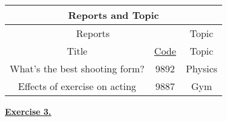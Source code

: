 \documentclass[12pt]{article}
\begin{document}
\begin{center}
    \begin{tabular}{|c|c||c|}
        \hline
        \multicolumn{3}{|c|}{\cellcolor{gray!25}Reports and Topic}                     \\
        \hline
        \hline
        \multicolumn{2}{|c||}{\cellcolor{gray!25}Reports}
                                       & {\cellcolor{gray!25}Topic}                    \\
        \hline
        \cellcolor{gray!25}Title
                                       & \cellcolor{gray!25}\underline{Code}
                                       & \cellcolor{gray!25}Topic                      \\
        \hline \hline
        What's the best shooting form? & 9892                                & Physics \\ \hline
        Effects of exercise on acting  & 9887                                & Gym     \\ \hline
    \end{tabular}
\end{center}
\newpage
\noindent \hyperlink{toc}{\hypertarget{3}{\LARGE \underline{\textbf{Exercise 3.}}}}\\[1cm]
\end{document}
